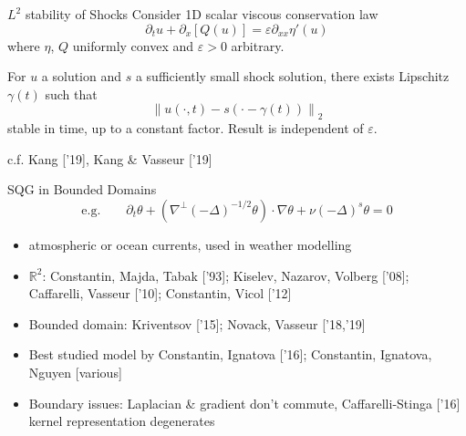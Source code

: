\documentclass{beamer}
\newcommand{\R}{\mathbb{R}}
\newcommand{\eps}{\varepsilon}
\newcommand{\norm}[1]{\left\lVert#1\right\rVert}
\newcommand{\paren}[1]{\left( #1 \right)}
\newcommand{\del}{\partial}
\newcommand{\grad}{\nabla}
\newcommand{\Laplace}{\Delta}
\begin{document}

\begin{frame}{$L^2$ stability of Shocks}
\pause
Consider 1D scalar viscous conservation law
\[ \del_t u + \del_x[Q(u)] = \eps \del_{xx} \eta'(u) \]
where $\eta$, $Q$ uniformly convex and $\eps > 0$ arbitrary.

\begin{theorem}[S. [Submitted{]}]
For $u$ a solution and $s$ a sufficiently small shock solution, there exists Lipschitz $\gamma(t)$ such that
\[ \norm{u(\cdot,t) - s(\cdot-\gamma(t))}_2 \] 
stable in time, up to a constant factor.  Result is independent of $\eps$.  
\end{theorem}

c.f. Kang ['19], Kang \& Vasseur ['19]
\end{frame}


\begin{frame}{SQG in Bounded Domains}
\pause
\[ \textrm{e.g.} \qquad \del_t \theta + \paren{\grad^\perp (-\Laplace)^{-1/2} \theta} \cdot \grad \theta + \nu (-\Laplace)^s \theta = 0 \]
\begin{itemize}
\item atmospheric or ocean currents, used in weather modelling
\item $\R^2$: Constantin, Majda, Tabak ['93]; Kiselev, Nazarov, Volberg ['08]; Caffarelli, Vasseur ['10]; Constantin, Vicol ['12]
\item Bounded domain: Kriventsov ['15]; Novack, Vasseur ['18,'19]
\item Best studied model by Constantin, Ignatova ['16]; Constantin, Ignatova, Nguyen [various]
\item Boundary issues: Laplacian \& gradient don't commute, Caffarelli-Stinga ['16] kernel representation degenerates
\end{itemize}
\end{frame}

\end{document}
